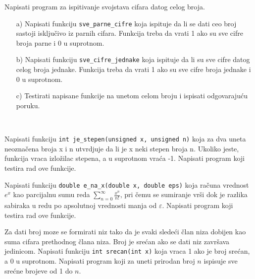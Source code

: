 \begin{Exercise}[label=v1.4_10] 
Napisati program za ispitivanje svojstava cifara datog celog broja.
\begin{itemize}
\item [a)] Napisati funkciju \verb|sve_parne_cifre| koja ispituje da li se dati ceo broj sastoji isključivo iz parnih cifara. Funkcija treba
da vrati 1 ako su sve cifre broja parne i 0 u suprotnom. 
\item [b)] Napisati funkciju \verb|sve_cifre_jednake| koja ispituje da li su sve cifre datog celog broja jednake. Funkcija treba
da vrati 1 ako su sve cifre broja jednake i 0 u suprotnom. 
\item [c)] Testirati napisane funkcije na unetom celom broju i ispisati odgovarajuću poruku.
\end{itemize} \\ 
\end{Exercise}
\begin{Answer}[ref=v1.4_10]
\end{Answer}

\begin{Exercise}[label=v1.4_11] 
Napisati funkciju 
\verb|int je_stepen(unsigned x, unsigned n)|
koja za dva uneta neoznačena broja x i n utvrdjuje da li je x neki stepen
broja n. Ukoliko jeste, funkcija vraca izložilac stepena, a u suprotnom vraća -1. Napisati program koji testira rad ove funkcije.\\ 
\end{Exercise}
\begin{Answer}[ref=v1.4_11]
\end{Answer}

\begin{Exercise}[label=v1.4_12] 
Napisati funkciju 
\verb|double e_na_x(double x, double eps)|
koja računa vrednost $e^x$ kao parcijalnu sumu reda
 $\sum_{n=0}^{\infty}\frac{x^n}{n!}$, pri čemu se sumiranje vrši dok
 je razlika sabiraka u redu po apsolutnoj vrednosti
 manja od $\varepsilon$. Napisati program koji testira rad ove funkcije.\\ 
\end{Exercise}
\begin{Answer}[ref=v1.4_12]
\end{Answer}

\begin{Exercise}[label=v1.4_13] 
Za dati broj moze se formirati niz tako da je svaki sledeći član niza dobijen
kao suma cifara prethodnog člana niza. Broj je srećan ako se dati niz završava 
jedinicom. Napisati funkciju 
\verb|int srecan(int x)|
 koja vraca 1 ako je broj srećan, a 0 u suprotnom. Napisati program koji za uneti prirodan broj $n$ ispisuje sve srećne brojeve od 1 do $n$.\\ 
\end{Exercise}
\begin{Answer}[ref=v1.4_13]
\end{Answer}

